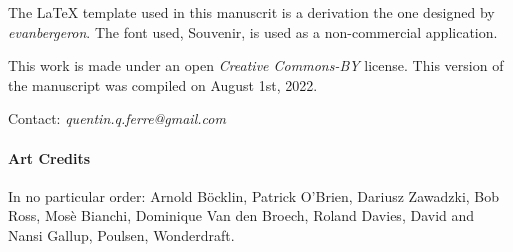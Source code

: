 The LaTeX template used in this manuscrit is a derivation the one designed by \textit{evanbergeron}. The font used, Souvenir, is used as a non-commercial application.

\vskip 0.5cm

This work is made under an open \textit{Creative Commons-BY} license. This version of the manuscript was compiled on August 1st, 2022.



Contact: \textit{quentin.q.ferre@gmail.com}




\paragraph{Art Credits}

In no particular order: Arnold Böcklin, Patrick O'Brien, Dariusz Zawadzki, Bob Ross, Mosè Bianchi, Dominique Van den Broech, Roland Davies, David and Nansi Gallup, Poulsen, Wonderdraft.


